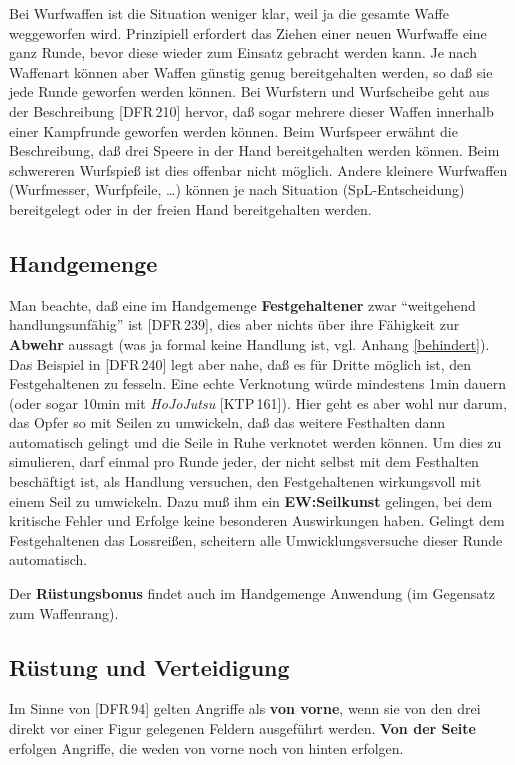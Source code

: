 \documentclass[10pt,a4paper,germanpar]{article}
\begin{document}
Bei Wurfwaffen ist die Situation weniger klar, weil ja die gesamte
Waffe weggeworfen wird. Prinzipiell erfordert das Ziehen einer neuen
Wurfwaffe eine ganz Runde, bevor diese wieder zum Einsatz gebracht
werden kann. Je nach Waffenart können aber Waffen günstig genug
bereitgehalten werden, so daß sie jede Runde geworfen werden
können. Bei Wurfstern und Wurfscheibe geht aus der Beschreibung
[DFR\,210] hervor, daß sogar mehrere dieser Waffen innerhalb einer
Kampfrunde geworfen werden können. Beim Wurfspeer erwähnt die
Beschreibung, daß drei Speere in der Hand bereitgehalten werden
können. Beim schwereren Wurfspieß ist dies offenbar nicht
möglich. Andere kleinere Wurfwaffen (Wurfmesser, Wurfpfeile, \dots)
können je nach Situation (SpL-Entscheidung) bereitgelegt oder
in der freien Hand bereitgehalten werden.

\subsection{Handgemenge}

Man beachte, daß eine im Handgemenge \textbf{Festgehaltener} zwar
"`weitgehend handlungsunfähig"' ist [DFR\,239], dies aber nichts über
ihre Fähigkeit zur \textbf{Abwehr} aussagt (was ja formal keine Handlung
ist, vgl. Anhang \ref{behindert}). Das Beispiel in [DFR\,240] legt
aber nahe, daß es für Dritte möglich ist, den Festgehaltenen zu
fesseln. Eine echte Verknotung würde mindestens 1min dauern (oder
sogar 10min mit \emph{HoJoJutsu} [KTP\,161]). Hier geht es aber wohl
nur darum, das Opfer so mit Seilen zu umwickeln, daß das weitere
Festhalten dann automatisch gelingt und die Seile in Ruhe verknotet
werden können. Um dies zu simulieren, darf einmal pro Runde jeder, der
nicht selbst mit dem Festhalten beschäftigt ist, als Handlung
versuchen, den Festgehaltenen wirkungsvoll mit einem Seil zu
umwickeln. Dazu muß ihm ein \textbf{EW:Seilkunst} gelingen, bei dem
kritische Fehler und Erfolge keine besonderen Auswirkungen
haben. Gelingt dem Festgehaltenen das Lossreißen, scheitern alle
Umwicklungsversuche dieser Runde automatisch.

Der \textbf{Rüstungsbonus} findet auch im Handgemenge Anwendung (im
Gegensatz zum Waffenrang).

\subsection{Rüstung und Verteidigung}

Im Sinne von [DFR\,94] gelten Angriffe als \textbf{von vorne}, wenn
sie von den drei direkt vor einer Figur gelegenen Feldern ausgeführt
werden. \textbf{Von der Seite} erfolgen Angriffe, die weden von vorne
noch von hinten erfolgen.
\end{document}
